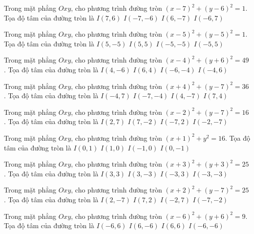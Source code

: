 \begin{ex}
Trong mặt phẳng $Oxy$, cho phương trình đường tròn $(x -7)^2   + (y -6)^2 = 1$. Tọa độ tâm của đường tròn là
\choice
{ \True $I(7, 6)$ }
{ $I(-7, -6)$ }
{ $I(6, -7)$ }
{ $I(-6, 7)$ }
\end{ex}

\begin{ex}
Trong mặt phẳng $Oxy$, cho phương trình đường tròn $(x -5)^2   + (y -5)^2 = 1$. Tọa độ tâm của đường tròn là
\choice
{ $I(5, -5)$ }
{ \True $I(5, 5)$ }
{ $I(-5, -5)$ }
{ $I(-5, 5)$ }
\end{ex}

\begin{ex}
Trong mặt phẳng $Oxy$, cho phương trình đường tròn $(x -4)^2   + (y + 6)^2 = 49$. Tọa độ tâm của đường tròn là
\choice
{ \True $I(4, -6)$ }
{ $I(6, 4)$ }
{ $I(-6, -4)$ }
{ $I(-4, 6)$ }
\end{ex}

\begin{ex}
Trong mặt phẳng $Oxy$, cho phương trình đường tròn $(x + 4)^2  + (y -7)^2 = 36$. Tọa độ tâm của đường tròn là
\choice
{ \True $I(-4, 7)$ }
{ $I(-7, -4)$ }
{ $I(4, -7)$ }
{ $I(7, 4)$ }
\end{ex}

\begin{ex}
Trong mặt phẳng $Oxy$, cho phương trình đường tròn $(x -2)^2   + (y -7)^2 = 16$. Tọa độ tâm của đường tròn là
\choice
{ \True $I(2, 7)$ }
{ $I(7, -2)$ }
{ $I(-7, 2)$ }
{ $I(-2, -7)$ }
\end{ex}

\begin{ex}
Trong mặt phẳng $Oxy$, cho phương trình đường tròn $(x + 1)^2  + y^2 = 16$. Tọa độ tâm của đường tròn là
\choice
{ $I(0, 1)$ }
{ $I(1, 0)$ }
{ \True $I(-1, 0)$ }
{ $I(0, -1)$ }
\end{ex}

\begin{ex}
Trong mặt phẳng $Oxy$, cho phương trình đường tròn $(x + 3)^2  + (y + 3)^2 = 25$. Tọa độ tâm của đường tròn là
\choice
{ $I(3, 3)$ }
{ $I(3, -3)$ }
{ $I(-3, 3)$ }
{ \True $I(-3, -3)$ }
\end{ex}

\begin{ex}
Trong mặt phẳng $Oxy$, cho phương trình đường tròn $(x + 2)^2  + (y -7)^2 = 25$. Tọa độ tâm của đường tròn là
\choice
{ $I(2, -7)$ }
{ $I(7, 2)$ }
{ \True $I(-2, 7)$ }
{ $I(-7, -2)$ }
\end{ex}

\begin{ex}
Trong mặt phẳng $Oxy$, cho phương trình đường tròn $(x -6)^2   + (y + 6)^2 = 9$. Tọa độ tâm của đường tròn là
\choice
{ $I(-6, 6)$ }
{ \True $I(6, -6)$ }
{ $I(6, 6)$ }
{ $I(-6, -6)$ }
\end{ex}

